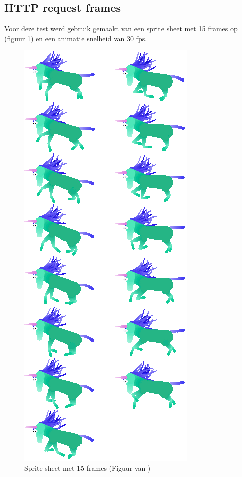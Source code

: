 \subsection{HTTP request frames}

Voor deze test werd gebruik gemaakt van een sprite sheet met 15 frames op (figuur \ref{sheet}) en een animatie snelheid van 30 fps.

\begin{figure} [H]
	\centering
	\includegraphics [scale=0.7] {img/charging.png}
	\caption{Sprite sheet met 15 frames (Figuur van \cite{stackoverflow})} \label{sheet}
\end{figure}


